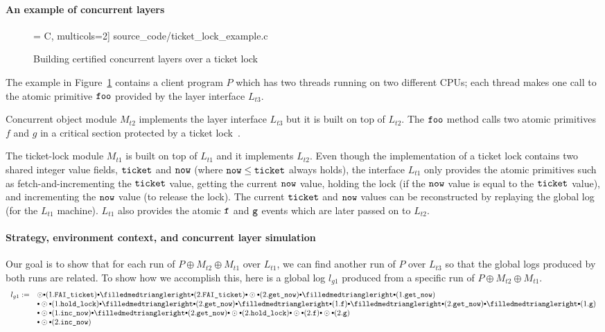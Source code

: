 \paragraph{An example of concurrent layers}
\begin{figure}[t]\centering
 = C, multicols=2] {source_code/ticket_lock_example.c}
\caption{Building certified concurrent layers over a ticket lock}
\label{fig:exp:ticket_lock_example}
\hrulefill
\end{figure}

The example in Figure~\ref{fig:exp:ticket_lock_example} contains a
client program $P$ which has two threads running on two different
CPUs; each thread makes one call to the atomic primitive ${\texttt{foo}}$
provided by the layer interface $L_{t3}$.

Concurrent object module $M_{t2}$ implements the layer interface $L_{t3}$
but it is built on top of $L_{t2}$.  The ${\texttt{foo}}$ method calls two
atomic primitives $f$ and $g$ in a critical section protected by a
ticket lock~\cite{mcs91}.

The ticket-lock module $M_{t1}$ is built on top of $L_{t1}$ and it
implements $L_{t2}$. Even though the implementation of a ticket lock
contains two shared integer value fields, ${\texttt{ticket}}$ and
${\texttt{now}}$ (where ${\texttt{now}} \leq {\texttt{ticket}}$ always holds), the
interface $L_{t1}$ only provides the atomic primitives such as
fetch-and-incrementing the ${\texttt{ticket}}$ value, getting the current
${\texttt{now}}$ value, holding the lock (if the ${\texttt{now}}$ value is
equal to the ${\texttt{ticket}}$ value), and incrementing the ${\texttt{now}}$
value (to release the lock). The current ${\texttt{ticket}}$ and
${\texttt{now}}$ values can be reconstructed by replaying the global log
(for the $L_{t1}$ machine).  $L_{t1}$ also provides the atomic ${\texttt{f}}$
and ${\texttt{g}}$ events which are later passed on to $L_{t2}$.

\paragraph{Strategy, environment context, and concurrent layer simulation}
Our goal is to show that for each run of $P\oplus{}M_{t2}\oplus{}M_{t1}$
over $L_{t1}$, we can find another run of $P$ over $L_{t3}$ so that the
global logs produced by both runs are related.
To show how we accomplish this, here is
a global log $l_{g1}$ produced from  
a specific run of $P\oplus{}M_{t2}\oplus{}M_{t1}$.
\[
\begin{array}{rl}
l_{g1}:= & \ssame \cons (1.\incticket) \cons
\sdiff \cons (2.\incticket) \cons
\ssame \cons (2.\getnow) \cons
\sdiff \cons (1.\getnow)  \\
& \cons\ssame \cons (1.\holdlock) 
\cons 
\sdiff \cons (2.\getnow) \cons
\sdiff \cons (1.\comm{f}) \cons
\sdiff \cons (2.\getnow) \cons
\sdiff \cons (1.\comm{g}) \\
& \cons
\ssame \cons (1.\incnow) 
\cons \sdiff \cons (2.\getnow) 
\cons
\ssame \cons (2.\holdlock) \cons
\ssame \cons (2.\comm{f}) \cons
\ssame \cons (2.\comm{g}) \\
&\cons
\ssame \cons (2.\incnow) 
\end{array}
\]

